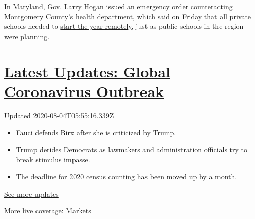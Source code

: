 In Maryland, Gov. Larry Hogan
\href{https://twitter.com/GovLarryHogan/status/1290330304830246912}{issued
an emergency order} counteracting Montgomery County's health department,
which said on Friday that all private schools needed to
\href{https://www.washingtonpost.com/local/education/montgomery-county-health-officials-tell-private-schools-to-start-school-online/2020/08/01/64552b9e-d3fd-11ea-9038-af089b63ac21_story.html}{start
the year remotely}, just as public schools in the region were planning.

\hypertarget{latest-updates-global-coronavirus-outbreak}{%
\section{\texorpdfstring{\href{https://www.nytimes.com/2020/08/03/world/coronavirus-covid-19.html?action=click\&pgtype=Article\&state=default\&region=MAIN_CONTENT_1\&context=storylines_live_updates}{Latest
Updates: Global Coronavirus
Outbreak}}{Latest Updates: Global Coronavirus Outbreak}}\label{latest-updates-global-coronavirus-outbreak}}

Updated 2020-08-04T05:55:16.339Z

\begin{itemize}
\tightlist
\item
  \href{https://www.nytimes.com/2020/08/03/world/coronavirus-covid-19.html?action=click\&pgtype=Article\&state=default\&region=MAIN_CONTENT_1\&context=storylines_live_updates\#link-4547638f}{Fauci
  defends Birx after she is criticized by Trump.}
\item
  \href{https://www.nytimes.com/2020/08/03/world/coronavirus-covid-19.html?action=click\&pgtype=Article\&state=default\&region=MAIN_CONTENT_1\&context=storylines_live_updates\#link-15e7f995}{Trump
  derides Democrats as lawmakers and administration officials try to
  break stimulus impasse.}
\item
  \href{https://www.nytimes.com/2020/08/03/world/coronavirus-covid-19.html?action=click\&pgtype=Article\&state=default\&region=MAIN_CONTENT_1\&context=storylines_live_updates\#link-e5a2cda}{The
  deadline for 2020 census counting has been moved up by a month.}
\end{itemize}

\href{https://www.nytimes.com/2020/08/03/world/coronavirus-covid-19.html?action=click\&pgtype=Article\&state=default\&region=MAIN_CONTENT_1\&context=storylines_live_updates}{See
more updates}

More live coverage:
\href{https://www.nytimes.com/live/2020/08/03/business/stock-market-today-coronavirus?action=click\&pgtype=Article\&state=default\&region=MAIN_CONTENT_1\&context=storylines_live_updates}{Markets}

